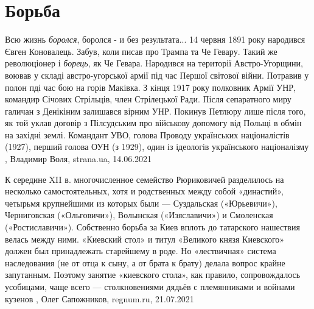  
 
 
 
 
\chapter{Борьба}
\label{sec:slova.borjba}

Всю жизнь \emph{боролся}, боролся - и без результата... 14 червня 1891 року
народився Євген Коновалець. Забув, коли писав про Трампа та Че Гевару. Такий
же революціонер і \emph{борець}, як Че Гевара. Народився на території
Австро-Угорщини, воював у складі австро-угорської армії під час Першої світової
війни. Потравив у полон пді час бою на горів Маківка. З кінця 1917 року
полковник Армії УНР, командир Січових Стрільців, член Стрілецької Ради. Після
сепаратного миру галичан з Денікіним залишався вірним УНР. Покинув Петлюру лише
після того, як той уклав договір з Пілсудським про військову допомогу від
Польщі в обмін на західні землі. Командант УВО, голова Проводу українських
націоналістів (1927), перший голова ОУН (з 1929), один із ідеологів
українського націоналізму
, 
Владимир Воля, strana.ua, 14.06.2021

К середине XII в. многочисленное семейство Рюриковичей разделилось на несколько
самостоятельных, хотя и родственных между собой «династий», четырьмя
крупнейшими из которых были — Суздальская («Юрьевичи»), Черниговская
(«Ольговичи»), Волынская («Изяславичи») и Смоленская («Ростиславичи»).
Собственно борьба за Киев вплоть до татарского нашествия велась между ними.
«Киевский стол» и титул «Великого князя Киевского» должен был принадлежать
старейшему в роде. Но «лествичная» система наследования (не от отца к сыну, а
от брата к брату) делала вопрос крайне запутанным. Поэтому занятие «киевского
стола», как правило, сопровождалось усобицами, чаще всего — столкновениями
дядьёв с племянниками и войнами кузенов
, 
Олег Сапожников, regnum.ru, 21.07.2021
